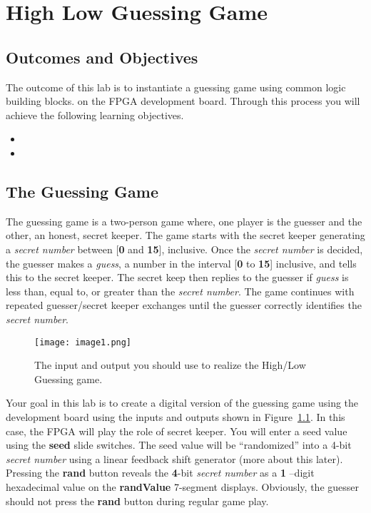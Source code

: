 \chapter{High Low Guessing Game}
\label{chapter:RPS}
\graphicspath{ {./Lab04HighLow/Fig} }



\section{Outcomes and Objectives}

The outcome of this lab is to instantiate a guessing game using 
common logic building blocks.
on the FPGA development board. 
Through this process you will achieve the following
learning objectives.
\begin{itemize}
	\itemsep=0em
	\item {}
	\item {}
\end{itemize}

\section{The Guessing Game}

The guessing game is a two-person game where, one player is the guesser
and the other, an honest, secret keeper. The game starts with the secret
keeper generating a \emph{secret number} between {[}\textbf{0} and
\textbf{15}{]}, inclusive. Once the \emph{secret number} is decided, the
guesser makes a \emph{guess}, a number in the interval {[}\textbf{0} to
\textbf{15}{]} inclusive, and tells this to the secret keeper. The
secret keep then replies to the guesser if \emph{guess} is less than,
equal to, or greater than the \emph{secret number}. The game continues
with repeated guesser/secret keeper exchanges until the guesser
correctly identifies the \emph{secret number}.

\begin{figure}[ht]
\texttt{[image: image1.png]}
\caption{The input and output you should use to realize the High/Low Guessing game.}
\label{fig:inputOutputDevBoard}
\end{figure}

Your goal in this lab is to create a digital version of the guessing
game using the development board using the inputs and outputs shown in
Figure~\ref{fig:inputOutputDevBoard}. In this case, the FPGA will play the role of secret keeper.
You will enter a seed value using the \textbf{seed} slide switches. The
seed value will be ``randomized'' into a 4-bit \emph{secret number}
using a linear feedback shift generator (more about this later).
Pressing the \textbf{rand} button reveals the \textbf{4}-bit
\emph{secret number} as a \textbf{1} --digit hexadecimal value on the
\textbf{randValue} 7-segment displays. Obviously, the guesser should not
press the \textbf{rand} button during regular game play.

